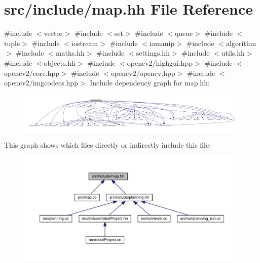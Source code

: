 \hypertarget{map_8hh}{}\section{src/include/map.hh File Reference}
\label{map_8hh}
{\ttfamily \#include $<$vector$>$}\newline
{\ttfamily \#include $<$set$>$}\newline
{\ttfamily \#include $<$queue$>$}\newline
{\ttfamily \#include $<$tuple$>$}\newline
{\ttfamily \#include $<$iostream$>$}\newline
{\ttfamily \#include $<$iomanip$>$}\newline
{\ttfamily \#include $<$algorithm$>$}\newline
{\ttfamily \#include $<$maths.\+hh$>$}\newline
{\ttfamily \#include $<$settings.\+hh$>$}\newline
{\ttfamily \#include $<$utils.\+hh$>$}\newline
{\ttfamily \#include $<$objects.\+hh$>$}\newline
{\ttfamily \#include $<$opencv2/highgui.\+hpp$>$}\newline
{\ttfamily \#include $<$opencv2/core.\+hpp$>$}\newline
{\ttfamily \#include $<$opencv2/opencv.\+hpp$>$}\newline
{\ttfamily \#include $<$opencv2/imgcodecs.\+hpp$>$}\newline
Include dependency graph for map.\+hh\+:
\nopagebreak
\begin{figure}[H]
\begin{center}
\leavevmode
\includegraphics[width=350pt]{map_8hh__incl}
\end{center}
\end{figure}
This graph shows which files directly or indirectly include this file\+:
\nopagebreak
\begin{figure}[H]
\begin{center}
\leavevmode
\includegraphics[width=350pt]{map_8hh__dep__incl}
\end{center}
\end{figure}

